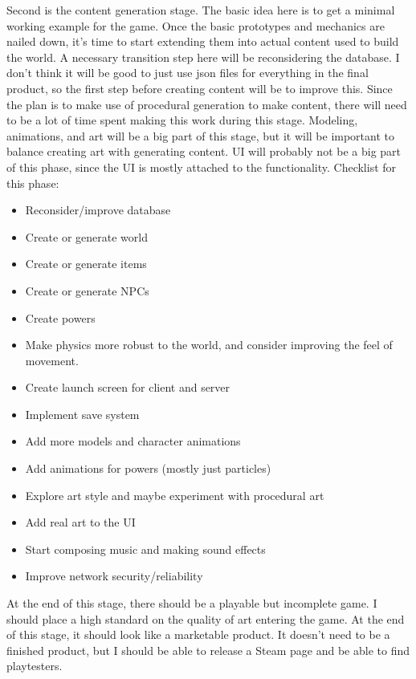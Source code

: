 \documentclass{article}
\begin{document}
Second is the content generation stage. The basic idea here is to get a minimal working
example for the game. Once the basic prototypes and mechanics are nailed down,
it's time to start extending them into actual content used to build the world.
A necessary transition step here will be reconsidering the database. I don't think
it will be good to just use json files for everything in the final product, so the first
step before creating content will be to improve this. Since the plan is to make use of procedural
generation to make content, there will need to be a lot of time spent making this work during
this stage. Modeling, animations, and art will be a big part of this stage, but it will be
important to balance creating art with generating content. UI will probably not be a big
part of this phase, since the UI is mostly attached to the functionality.
Checklist for this phase:
\begin{itemize}
    \item Reconsider/improve database
    \item Create or generate world
    \item Create or generate items
    \item Create or generate NPCs
    \item Create powers
    \item Make physics more robust to the world, and consider improving the feel of movement.
    \item Create launch screen for client and server
    \item Implement save system
    \item Add more models and character animations
    \item Add animations for powers (mostly just particles)
    \item Explore art style and maybe experiment with procedural art
    \item Add real art to the UI
    \item Start composing music and making sound effects
    \item Improve network security/reliability
\end{itemize}
At the end of this stage, there should be a playable but incomplete game.
I should place a high standard on the quality of art entering the game. At the end of this stage,
it should look like a marketable product. It doesn't need to be a finished product, but I should
be able to release a Steam page and be able to find playtesters.
\end{document}
